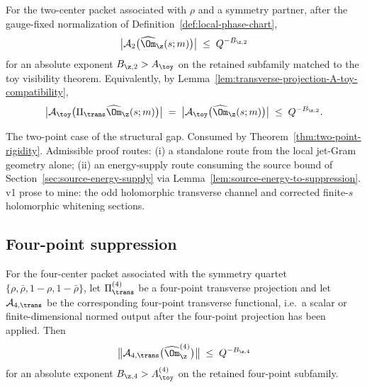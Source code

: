 \begin{hypothesis}
\label{hyp:zeta-suppression-two-point}
For the two-center packet associated with \(\rho\) and a symmetry
partner, after the gauge-fixed normalization of
Definition~\ref{def:local-phase-chart},
\begin{equation}
\label{eq:zeta-suppression-two-point-scalar}
        \bigl|\mathcal A_2\bigl(\widehat\Om_\z(s;m)\bigr)\bigr|
        \;\le\; Q^{-B_{\z,2}}
\end{equation}
for an absolute exponent \(B_{\z,2}>A_\toy\) on the retained
subfamily matched to the toy visibility theorem.  Equivalently, by
Lemma~\ref{lem:transverse-projection-A-toy-compatibility},
\[
        \bigl|\mathcal A_\toy\bigl(\Pi_\trans\widehat\Om_\z(s;m)\bigr)\bigr|
        \;=\;
        \bigl|\mathcal A_\toy\bigl(\widehat\Om_\z(s;m)\bigr)\bigr|
        \;\le\; Q^{-B_{\z,2}}.
\]
\end{hypothesis}

\begin{wip}\label{rem:wip-zeta-suppression-two-point}
The two-point case of the structural gap.  Consumed by
Theorem~\ref{thm:two-point-rigidity}.  Admissible proof routes:
\textup{(i)} a standalone route from the local jet-Gram geometry alone;
\textup{(ii)} an energy-supply route consuming the source bound
of Section~\ref{sec:source-energy-supply} via
Lemma~\ref{lem:source-energy-to-suppression}.  v1 prose to mine: the
odd holomorphic transverse channel and corrected finite-\(s\)
holomorphic whitening sections.
\end{wip}

\subsection{Four-point suppression}
\label{subsec:four-point-suppression}

\begin{hypothesis}
\label{hyp:zeta-suppression-four-point}
For the four-center packet associated with the symmetry quartet
\(\{\rho,\bar\rho,1-\rho,1-\bar\rho\}\), let
\(\Pi_\trans^{(4)}\) be a four-point transverse projection and let
\(\mathcal A_{4,\trans}\) be the corresponding four-point transverse
functional, i.e.\ a scalar or finite-dimensional normed output after
the four-point projection has been applied.  Then
\begin{equation}
\label{eq:zeta-suppression-four-point-transverse}
        \bigl\|\mathcal A_{4,\trans}\bigl(\widehat\Om_\z^{(4)}\bigr)\bigr\|
        \;\le\; Q^{-B_{\z,4}}
\end{equation}
for an absolute exponent \(B_{\z,4}>A_\toy^{(4)}\) on the retained
four-point subfamily.
\end{hypothesis}

